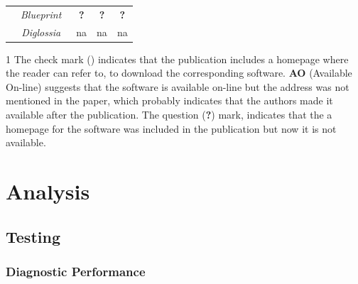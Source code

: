 \documentclass[conference]{IEEEtran}
\newcommand{\tick}{\ding{52}}
\begin{document}
\begin{table}
\begin{threeparttable}
\begin{small}
{\begin{tabular}{l|c|ccc}
  &   {\it Blueprint}~\cite{LV09} & {\bf ?} & {\bf ?} & {\bf ?} \\
  &   {\it Diglossia}~\cite{SMS13} & {\sc na} & {\sc na} & {\sc na} \\
  \hline
    \end{tabular}}
    \begin{tablenotes}
  \begin{footnotesize}
       \item[1] The check mark (\tick) indicates that the publication
       includes a homepage where the reader can refer to, to
       download the corresponding software. {\bf AO} (Available On-line) suggests
       that the software is available on-line but the
       address was not mentioned in the paper, which probably indicates that
       the authors made it available after the publication. The question ({\bf ?})
       mark, indicates that the a homepage for the software was included
       in the publication but now it is not available.
  \end{footnotesize}
    \end{tablenotes}
    \end{small}
    \end{threeparttable}
\end{table}

\section{Analysis}
\label{sec:analysis}

\subsection{Testing}

\subsubsection{Diagnostic Performance}
\end{document}

